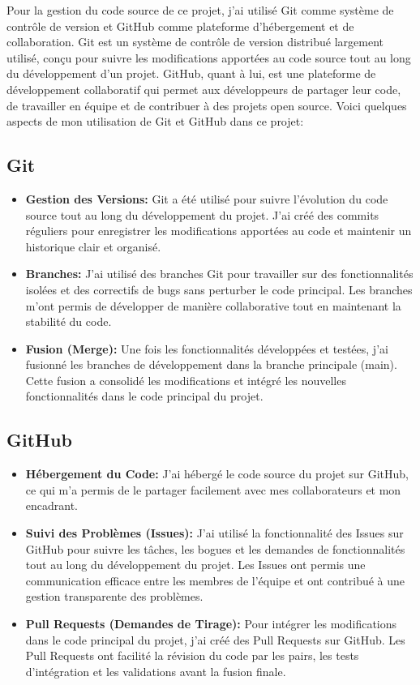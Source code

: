 \hspace{16pt}Pour la gestion du code source de ce projet, j'ai utilisé Git comme système de contrôle de version et GitHub comme plateforme d'hébergement et de collaboration. Git est un système de contrôle de version distribué largement utilisé, conçu pour suivre les modifications apportées au code source tout au long du développement d'un projet. GitHub, quant à lui, est une plateforme de développement collaboratif qui permet aux développeurs de partager leur code, de travailler en équipe et de contribuer à des projets open source. Voici quelques aspects de mon utilisation de Git et GitHub dans ce projet:

\subsection{Git}

\begin{itemize}
  \item \textbf{Gestion des Versions: }Git a été utilisé pour suivre l'évolution du code source tout au long du développement du projet. J'ai créé des commits réguliers pour enregistrer les modifications apportées au code et maintenir un historique clair et organisé.
  \item \textbf{Branches: }J'ai utilisé des branches Git pour travailler sur des fonctionnalités isolées et des correctifs de bugs sans perturber le code principal. Les branches m'ont permis de développer de manière collaborative tout en maintenant la stabilité du code.
  \item \textbf{Fusion (Merge): }Une fois les fonctionnalités développées et testées, j'ai fusionné les branches de développement dans la branche principale (main). Cette fusion a consolidé les modifications et intégré les nouvelles fonctionnalités dans le code principal du projet.
\end{itemize}

\subsection{GitHub}

\begin{itemize}
  \item \textbf{Hébergement du Code: }J'ai hébergé le code source du projet sur GitHub, ce qui m'a permis de le partager facilement avec mes collaborateurs et mon encadrant.
  \item \textbf{Suivi des Problèmes (Issues): }J'ai utilisé la fonctionnalité des Issues sur GitHub pour suivre les tâches, les bogues et les demandes de fonctionnalités tout au long du développement du projet. Les Issues ont permis une communication efficace entre les membres de l'équipe et ont contribué à une gestion transparente des problèmes.
  \item \textbf{Pull Requests (Demandes de Tirage): }Pour intégrer les modifications dans le code principal du projet, j'ai créé des Pull Requests sur GitHub. Les Pull Requests ont facilité la révision du code par les pairs, les tests d'intégration et les validations avant la fusion finale.
\end{itemize}


